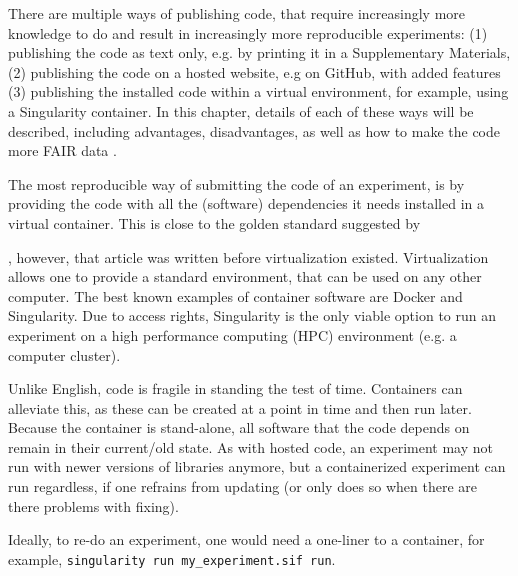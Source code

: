 There are multiple ways of publishing code,
that require increasingly more knowledge to do and result
in increasingly more reproducible experiments:
(1) publishing the code as text only, e.g. by printing
it in a Supplementary Materials, (2) publishing
the code on a hosted website, e.g on GitHub, with
added features (3) publishing 
the installed code within a virtual environment,
for example, using a Singularity container.
In this chapter, details of each of these ways will be described,
including advantages, disadvantages, as well as how to
make the code more FAIR data \cite{wilkinson2016fair}.


The most reproducible way of submitting the code of an experiment,
is by providing the code with all the (software) dependencies 
it needs installed in a virtual container.
This is close to the golden standard suggested by 
\cite{peng2011reproducible} 

,
however, that article was written before virtualization existed.
Virtualization allows one to provide a standard environment,
that can be used on any other computer.
The best known examples of container software are Docker and Singularity.
Due to access rights, Singularity is the only viable option to run
an experiment on a 
high performance computing (HPC) environment (e.g. a computer cluster).


Unlike English, code is fragile in standing the test of time.
Containers can alleviate this, as these can be created at a point
in time and then run later. Because the container is stand-alone,
all software that the code depends on remain in their current/old state.
As with hosted code, an experiment may not run with newer versions
of libraries anymore, but a containerized experiment can run regardless, 
if one refrains from updating (or only does so when there are there problems with fixing).

Ideally, to re-do an experiment, one would need a one-liner to a container,
for example, \verb|singularity run my_experiment.sif run|.

